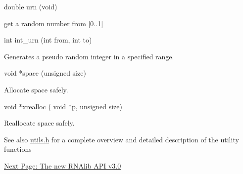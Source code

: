 \begin{DoxyVerb}double urn (void)
\end{DoxyVerb}
 get a random number from \mbox{[}0..1\mbox{]}

\begin{DoxyVerb}int    int_urn (int from, int to)
\end{DoxyVerb}
 Generates a pseudo random integer in a specified range.

\begin{DoxyVerb}void  *space (unsigned size)
\end{DoxyVerb}
 Allocate space safely.

\begin{DoxyVerb}void  *xrealloc ( void *p,
                  unsigned size)
\end{DoxyVerb}
 Reallocate space safely.

\begin{DoxySeeAlso}{See also}
\hyperlink{utils_8h}{utils.\+h} for a complete overview and detailed description of the utility functions
\end{DoxySeeAlso}


\hyperlink{mp_example}{Next Page\+: The new R\+N\+Alib A\+P\+I v3.0} 